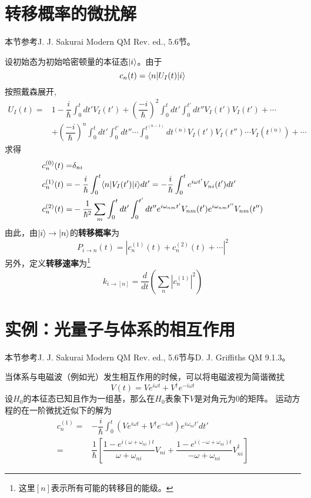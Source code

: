 \section{转移概率的微扰解}
\begin{framed}
本节参考J. J. Sakurai Modern QM Rev. ed., 5.6节。
\end{framed}
设初始态为初始哈密顿量的本征态$ |i\rangle $。由于
\begin{equation}\label{key}
c_n(t)=\langle n| U_I(t)|i\rangle
\end{equation}
按照戴森展开,
\begin{align}\label{key}
U_I(t)=&1-\dfrac{i}{\hbar}\int_0^tdt'V_I(t')+\left(\dfrac{-i}{\hbar}\right)^2\int_0^tdt'\int_0^{t'}dt''V_I(t')V_I(t')+\cdots\nonumber\\
&+\left(\dfrac{-i}{\hbar}\right)^n\int_0^tdt'\int_0^{t'}dt''\cdots\int_0^{t^{(n-1)}}dt^{(n)}V_I(t')V_I(t'')\cdots V_I(t^{(n)})+\cdots
\end{align}
求得
\begin{align}
c_n^{(0)}(t)=&\delta_{ni}\\
c_n^{(1)}(t)=&-\dfrac{i}{\hbar}\int_0^t\langle n|V_I(t')|i\rangle dt'=-\dfrac{i}{\hbar}\int_0^t e^{i\omega t'}V_{ni}(t') dt'\\
c_n^{(2)}(t)=&-\dfrac{1}{\hbar^2}\sum_m\int_0^tdt'\int_0^{t'}dt''e^{i\omega_{nm}t'}V_{nm}(t')e^{i\omega_{nm}t''}V_{nm}(t'')
\end{align}
由此，由$ |i\rangle\to|n\rangle $的\textbf{转移概率}为
\begin{equation}\label{key}
P_{i\to n}(t)=|c_n^{(1)}(t)+c_n^{(2)}(t)+\cdots|^2
\end{equation}
另外，定义\textbf{转移速率}为\footnote{这里$ [n] $表示所有可能的转移目的能级。}
\begin{equation}\label{key}k_{i\to [n]}=\dfrac{d}{dt}\left(\sum_n|c_n^{(1)}|^2\right)
\end{equation}
\section{实例：光量子与体系的相互作用}
\begin{framed}
本节参考J. J. Sakurai Modern QM Rev. ed., 5.6节与D. J. Griffiths QM 9.1.3。
\end{framed}

当体系与电磁波（例如光）发生相互作用的时候，可以将电磁波视为简谐微扰
\begin{equation}\label{key}
V(t)=Ve^{i\omega t}+V^\dagger e^{-i\omega t}
\end{equation}
设$ H_0 $的本征态已知且作为一组基，那么在$ H_0 $表象下$ V $是对角元为0的矩阵。
运动方程的在一阶微扰近似下的解为
\begin{align}\label{lit}
c_n^{(1)}=&-\dfrac{i}{\hbar}\int_0^t(Ve^{i\omega t}+V^\dagger e^{-i\omega t})e^{i\omega_{ni} t'}dt'\nonumber\\
=&\dfrac{1}{\hbar}\left[\dfrac{1-e^{i(\omega+\omega_{ni})t}}{\omega+\omega_{ni}}V_{ni}+\dfrac{1-e^{i(-\omega+\omega_{ni})t}}{-\omega+\omega_{ni}}V_{ni}^\dagger\right]
\end{align}

